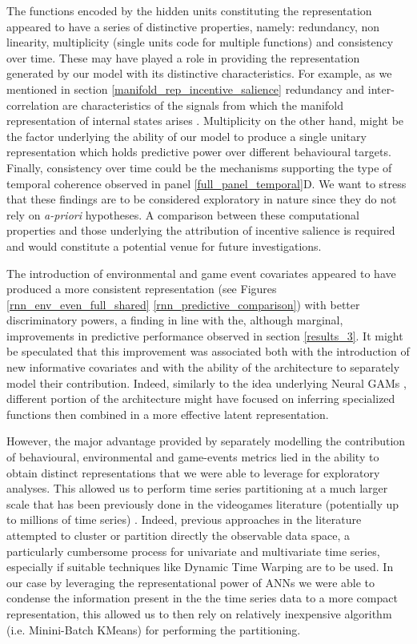 The functions encoded by the hidden units constituting the representation appeared to have a series of distinctive properties, namely: redundancy, non linearity, multiplicity (single units code for multiple functions) and consistency over time. These may have played a role in providing the representation generated by our model with its distinctive characteristics. For example, as we mentioned in section \ref{manifold_rep_incentive_salience} redundancy and inter-correlation are characteristics of the signals from which the manifold representation of internal states arises \cite{seung2000manifold,gallego2017neural}. Multiplicity on the other hand, might be the factor underlying the ability of our model to produce a single unitary representation which holds predictive power over different behavioural targets. Finally, consistency over time could be the mechanisms supporting the type of temporal coherence observed in panel \ref{full_panel_temporal}D. We want to stress that these findings are to be considered exploratory in nature since they do not rely on \textit{a-priori} hypotheses. A comparison between these computational properties and those underlying the attribution of incentive salience is required and would constitute a potential venue for future investigations. 

The introduction of environmental and game event covariates appeared to have produced a more consistent representation (see Figures \ref{rnn_env_even_full_shared} \ref{rnn_predictive_comparison}) with better discriminatory powers, a finding in line with the, although marginal, improvements in predictive performance observed in section \ref{results_3}. It might be speculated that this improvement was associated both with the introduction of new informative covariates and with the ability of the architecture to separately model their contribution. Indeed, similarly to the idea underlying Neural GAMs \cite{agarwal2021neural}, different portion of the architecture might have focused on inferring specialized functions then combined in a more effective latent representation.

However, the major advantage provided by separately modelling the contribution of behavioural, environmental and game-events metrics lied in the ability to obtain distinct representations that we were able to leverage for exploratory analyses. This allowed us to perform time series partitioning at a much larger scale that has been previously done in the videogames literature (potentially up to millions of time series) \cite{bauckhage2014clustering, makarovych2018like, vihanga2019weekly, aung2019trails}. Indeed, previous approaches in the literature attempted to cluster or partition directly the observable data space, a particularly cumbersome process for univariate and multivariate time series, especially if suitable techniques like Dynamic Time Warping \cite{muller2007dynamic} are to be used. In our case by leveraging the representational power of ANNs we were able to condense the information present in the the time series data to a more compact representation, this allowed us to then rely on relatively inexpensive algorithm (i.e. Minini-Batch KMeans) for performing the partitioning.

